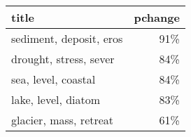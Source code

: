 \begin{tabular}{lr}
\toprule
                   title &  pchange \\
\midrule
 sediment, deposit, eros &      91\% \\
  drought, stress, sever &      84\% \\
     sea, level, coastal &      84\% \\
     lake, level, diatom &      83\% \\
  glacier, mass, retreat &      61\% \\
\bottomrule
\end{tabular}

